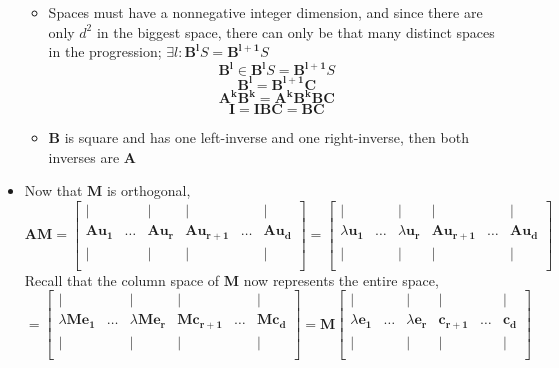 \documentclass[10pt, oneside]{article}
\renewcommand{\vec}[1]{\mathbf{#1}}
\newcommand{\mat}[1]{\mathbf{#1}}
\begin{document}
\begin{itemize}
\begin{itemize}
            \item Spaces must have a nonnegative integer dimension, and since there are only $d^2$ in the biggest space, there can only be that many distinct spaces in the progression; $\exists l: \mat{B^l}S = \mat{B^{l+1}}S$
                \[\mat{B^l} \in \mat{B^l}S = \mat{B^{l+1}}S\]
                \[\mat{B^l} = \mat{B^{l+1}}\mat{C}\]
                \[\mat{A^k}\mat{B^k} = \mat{A^k}\mat{B^k}\mat{B}\mat{C}\]
                \[\mat{I} = \mat{I}\mat{B}\mat{C} = \mat{B}\mat{C}\]
            \item $\mat{B}$ is square and has one left-inverse and one right-inverse, then both inverses are $\mat{A}$
        \end{itemize}
    \item Now that $\mat{M}$ is orthogonal, 
            \[\mat{A}\mat{M} = 
            \begin{bmatrix}
                | &  & | & | &  & |\\
                \mat{A}\vec{u_1} & \hdots & \mat{A}\vec{u_r} & \mat{A}\vec{u_{r+1}} & \hdots & \mat{A}\vec{u_d}\\
                | &  & | & | &  & |\\
            \end{bmatrix} =
            \begin{bmatrix}
                | &  & | & | &  & |\\
                \lambda\vec{u_1} & \hdots & \lambda\vec{u_r} & \mat{A}\vec{u_{r+1}} & \hdots & \mat{A}\vec{u_d}\\
                | &  & | & | &  & |\\
            \end{bmatrix}\]
        Recall that the column space of $\mat{M}$ now represents the entire space,
            \[= \begin{bmatrix}
                | &  & | & | &  & |\\
                \lambda\mat{M}\vec{e_1} & \hdots & \lambda\mat{M}\vec{e_r} & \mat{M}\vec{c_{r+1}} & \hdots & \mat{M}\vec{c_d}\\
                | &  & | & | &  & |\\
            \end{bmatrix}
            = \mat{M}\begin{bmatrix}
                | &  & | & | &  & |\\
                \lambda\vec{e_1} & \hdots & \lambda\vec{e_r} & \vec{c_{r+1}} & \hdots & \vec{c_d}\\
                | &  & | & | &  & |\\

\end{bmatrix}\]
\end{itemize}
\end{document}
